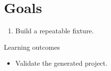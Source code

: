 \chapter{Goals}
\begin{enumerate}
\item Build a repeatable fixture.
\end{enumerate}

Learning outcomes
\begin{itemize}
\item Validate the generated project.
\end{itemize}

